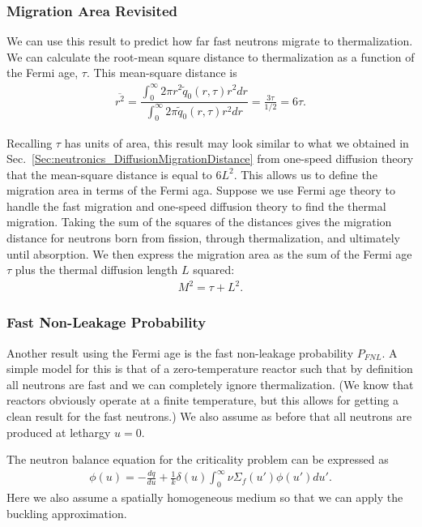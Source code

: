 \subsubsection{Migration Area Revisited}

We can use this result to predict how far fast neutrons migrate to thermalization. We can calculate the root-mean square distance to thermalization as a function of the Fermi age, $\tau$. This mean-square distance is
\begin{align}
  \overline{r^2} = \dfrac{ \displaystyle\int_0^\infty 2\pi r^2 \widetilde{q}_0(r,\tau) r^2 dr }{ \displaystyle\int_0^\infty 2\pi \widetilde{q}_0(r,\tau) r^2 dr } = \frac{ 3\tau }{1/2} = 6\tau .
\end{align}

Recalling $\tau$ has units of area, this result may look similar to what we obtained in Sec.~\ref{Sec:neutronics_DiffusionMigrationDistance} from one-speed diffusion theory that the mean-square distance is equal to $6 L^2$. This allows us to define the migration area in terms of the Fermi aga. Suppose we use Fermi age theory to handle the fast migration and one-speed diffusion theory to find the thermal migration. Taking the sum of the squares of the distances gives the migration distance for neutrons born from fission, through thermalization, and ultimately until absorption. We then express the migration area as the sum of the Fermi age $\tau$ plus the thermal diffusion length $L$ squared:
\begin{align}
  M^2 = \tau + L^2 .
\end{align}

\subsubsection{Fast Non-Leakage Probability}

Another result using the Fermi age is the fast non-leakage probability $P_{FNL}$. A simple model for this is that of a zero-temperature reactor such that by definition all neutrons are fast and we can completely ignore thermalization. (We know that reactors obviously operate at a finite temperature, but this allows for getting a clean result for the fast neutrons.) We also assume as before that all neutrons are produced at lethargy $u = 0$. 

The neutron balance equation for the criticality problem can be expressed as
\begin{align}
  [ B^2 D(u) + \Sigma_a(u) ] \phi(u) = -\frac{dq}{du} + \frac{1}{k} \delta(u) \int_0^\infty \nu\Sigma_f(u') \phi(u') du'. 
\end{align}
Here we also assume a spatially homogeneous medium so that we can apply the buckling approximation. 

